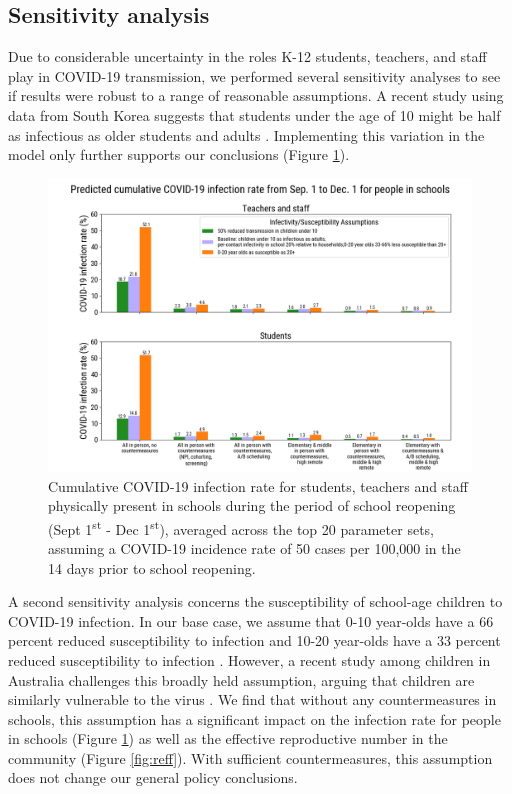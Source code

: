 \documentclass[preprint,12pt]{elsarticle}
\begin{document}
\subsection{Sensitivity analysis}

Due to considerable uncertainty in the roles K-12 students, teachers, and staff play in COVID-19 transmission, we performed several sensitivity analyses to see if results were robust to a range of reasonable assumptions. A recent study using data from South Korea suggests that students under the age of 10 might be half as infectious as older students and adults \cite{park_early_nodate}. Implementing this variation in the model only further supports our conclusions (Figure \ref{fig:attack_rate_sens}).

\begin{figure}[h]
    \centering
    \includegraphics[scale=0.4]{attack_rate_sens_2020-08-13.png}
    \caption{Cumulative COVID-19 infection rate for students, teachers and staff physically present in schools during the period of school reopening (Sept 1\textsuperscript{st} - Dec 1\textsuperscript{st}), averaged across the top 20 parameter sets, assuming a COVID-19 incidence rate of 50 cases per 100,000 in the 14 days prior to school reopening.}
    \label{fig:attack_rate_sens}
\end{figure}

A second sensitivity analysis concerns the susceptibility of school-age children to COVID-19 infection. In our base case, we assume that 0-10 year-olds have a 66 percent reduced susceptibility to infection and 10-20 year-olds have a 33 percent reduced susceptibility to infection \cite{zhang_changes_2020}. However, a recent study among children in Australia challenges this broadly held assumption, arguing that children are similarly vulnerable to the virus \cite{hyde_covid-19_2020}. We find that without any countermeasures in schools, this assumption has a significant impact on the infection rate for people in schools (Figure \ref{fig:attack_rate_sens}) as well as the effective reproductive number in the community (Figure \ref{fig:reff}). With sufficient countermeasures, this assumption does not change our general policy conclusions.
\end{document}
